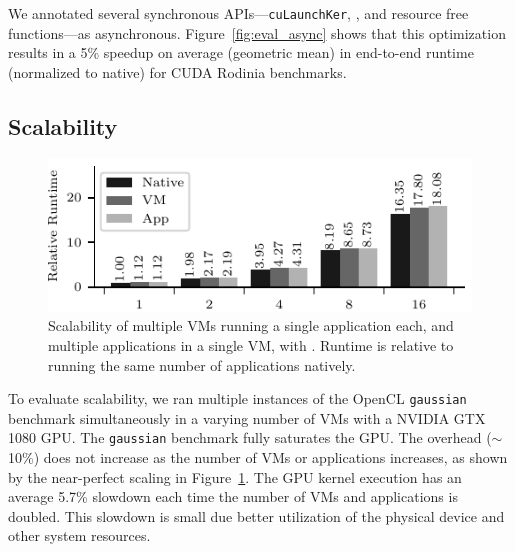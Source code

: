 We annotated several synchronous APIs---\lstinline[breaklines=true,escapechar=|]@cuLaunchKer@\-\lstinline@nel@, \lstinline@cuMemcpyHtoD@, and resource free functions---as asynchronous.
Figure~\ref{fig:eval_async} shows that this optimization results in a 5\% speedup on average (geometric mean) in end-to-end runtime (normalized to native) for CUDA Rodinia benchmarks.

\subsection{Scalability}
\begin{figure}
	\centering
	\includegraphics[width=.95\linewidth]{ava/data/scalability/scalability.pdf}%
	\vspace{-0.4em}
	\caption{Scalability of multiple VMs running a single application each, and multiple applications in a single VM,  with \AvA. Runtime is relative to running the same number of applications natively.}
	\label{fig:scalability}
	\vspace*{-.25em}
\end{figure}

To evaluate scalability, we ran multiple instances of the OpenCL \texttt{gaussian} benchmark
simultaneously in a varying number of VMs with a NVIDIA GTX 1080 GPU. The \texttt{gaussian} benchmark fully saturates the GPU.
The \AvA overhead ($\sim$10\%) does not increase as the number of VMs or applications increases,
as shown by the near-perfect scaling in Figure~\ref{fig:scalability}.
The GPU kernel execution has an average 5.7\% slowdown each time the number of VMs and applications is doubled.
This slowdown is small due
better utilization of the physical device and other system resources.

